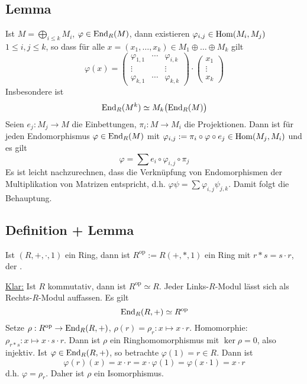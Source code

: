 \subsection[Lemma: Darstellung von $\varphi \in \End_R(M)$ als Matrix]{Lemma} %
\label{sub:227}
Ist $M = \bigoplus_{i \le k} M_i$, $\varphi \in \End_R(M)$, dann existieren $\varphi_{i,j} \in \Hom(M_i, M_j)$ $1 \le i,j \le k$, so dass für alle 
$x = (x_1, \ldots , x_k) \in M_1 \oplus \ldots \oplus M_k$ gilt
\[
	\varphi(x) = \begin{pmatrix}
		\varphi_{1,1} & \cdots & \varphi_{i,k} \\
		\vdots & &\vdots \\
		\varphi_{k,1} & \cdots & \varphi_{k,k}
	\end{pmatrix}\cdot 
	\begin{pmatrix}
		x_1 \\ \vdots \\ x_k
	\end{pmatrix}
\]
Insbesondere ist 
\[
	\End_R(M^k) \simeq M_k \enbrace[\big]{\End_R(M)}
\]
Seien $e_j : M_j \to M$ die Einbettungen, $\pi_i : M \to M_i$ die Projektionen. Dann ist für jeden Endomorphismus $\varphi \in \End_R(M)$ mit $\varphi_{i,j} := \pi_i \circ \varphi \circ e_j \in \Hom(M_j, M_i)$ und es gilt
\[
	\varphi = \sum e_i \circ \varphi_{i,j} \circ \pi_j
\]
Es ist leicht nachzurechnen, dass die Verknüpfung von Endomorphismen der Multiplikation von Matrizen entspricht, d.h. $\varphi \psi = \sum \varphi_{i,j} \psi_{j,k}$. Damit
folgt die Behauptung. \bewende

\subsection[Definition: Entgegengesetzter Ring $R^{\mathrm{op}}$]{Definition + Lemma} %
\label{sub:228}
Ist $(R,+,\cdot ,1)$ ein Ring, dann ist $R^{\mathrm{op}} := R(+, *, 1)$ ein Ring mit $r * s = s \cdot r$, der .

\uline{Klar:} Ist $R$ kommutativ, dann ist $R^{\mathrm{op}} \simeq R$. Jeder Links-$R$-Modul lässt sich als Rechts-$R$-Modul auffassen.
Es gilt
\[
	\End_R(R,+) \simeq R^\mathrm{op}
\]
Setze $\rho : R^\mathrm{op} \to \End_R(R,+)$, $\rho(r)= \rho_r : x \mapsto x \cdot r$. Homomorphie: $\rho_{r * s} : x \mapsto x \cdot s \cdot r$. Dann ist $\rho$ ein
Ringhomomorphismus mit $\ker \rho = 0$, also injektiv. Ist $\varphi \in \End_R(R,+)$, so betrachte $\varphi(1)= r \in R$. Dann ist 
\[
	\varphi(r)(x) = x \cdot r = x \cdot \varphi(1) = \varphi(x \cdot 1) = x \cdot r
\]
d.h. $\varphi = \rho_r$. Daher ist $\rho$ ein Isomorphismus. \bewende

